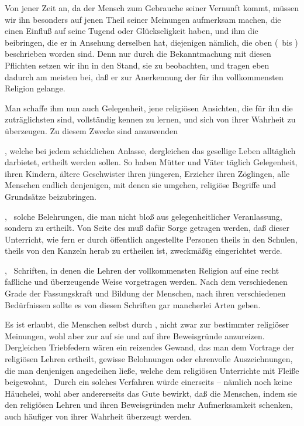 \begin{aufza}\setcounter{enumi}{1}
\item Von jener Zeit an, da der Mensch zum Gebrauche seiner Vernunft kommt, müssen wir ihn besonders auf jenen Theil seiner Meinungen aufmerksam machen, die einen Einfluß auf seine Tugend oder Glückseligkeit haben, und ihm die  beibringen, die er in Ansehung derselben hat, diejenigen nämlich, die oben (\ bis ) beschrieben worden sind. Denn nur durch die Bekanntmachung mit diesen Pflichten setzen wir ihn in den Stand, sie zu beobachten, und tragen eben dadurch am meisten bei, daß er zur Anerkennung der für ihn vollkommensten Religion gelange.
\item Man schaffe ihm nun auch Gelegenheit, jene religiösen Ansichten, die für ihn die zuträglichsten sind, vollständig kennen zu lernen, und sich von ihrer Wahrheit zu überzeugen. Zu diesem Zwecke sind anzuwenden
\begin{aufzb}
\item {}, welche bei jedem schicklichen Anlasse, dergleichen das gesellige Leben alltäglich darbietet, ertheilt werden sollen. So haben Mütter und Väter täglich Gelegenheit, ihren Kindern, ältere Geschwister ihren jüngeren, Erzieher ihren Zöglingen, alle Menschen endlich denjenigen, mit denen sie umgehen, religiöse Begriffe und Grundsätze beizubringen.
\item {}, \dh\ solche Belehrungen, die man nicht bloß aus gelegenheitlicher Veranlassung, sondern zu  ertheilt. Von Seite des  muß dafür Sorge getragen werden, daß dieser Unterricht, wie fern er durch öffentlich angestellte Personen theils in den Schulen, theils von den Kanzeln herab zu ertheilen ist, zweckmäßig eingerichtet werde.
\item {}, \dh\ Schriften, in denen die Lehren der vollkommensten Religion auf eine recht faßliche und überzeugende Weise vorgetragen werden. Nach dem verschiedenen Grade der Fassungskraft und Bildung der Menschen, nach ihren verschiedenen Bedürfnissen sollte es von diesen Schriften gar mancherlei Arten geben.
\end{aufzb}
\item Es ist erlaubt, die Menschen selbst durch , nicht zwar zur  bestimmter religiöser Meinungen, wohl aber zur  auf sie und auf ihre Beweisgründe anzureizen. Dergleichen Triebfedern wären ein reizendes Gewand, das man dem Vortrage der religiösen Lehren ertheilt, gewisse Belohnungen oder ehrenvolle Auszeichnungen, die man denjenigen angedeihen ließe, welche dem religiösen Unterrichte mit Fleiße beigewohnt, \udgl\ Durch ein solches Verfahren würde einerseits  -- nämlich noch keine Häuchelei, wohl aber andererseits das Gute bewirkt, daß die Menschen, indem sie den religiösen Lehren und ihren Beweisgründen mehr Aufmerksamkeit schenken, auch häufiger von ihrer Wahrheit überzeugt werden.
\end{aufza}\par
